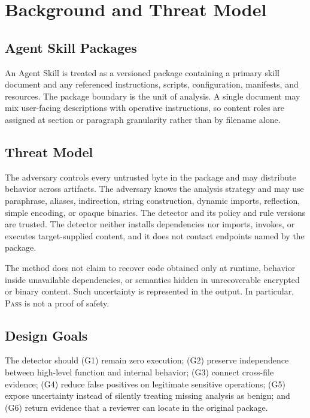 \section{Background and Threat Model}
\label{sec:background}

\subsection{Agent Skill Packages}

An Agent Skill is treated as a versioned package containing a primary skill
document and any referenced instructions, scripts, configuration, manifests,
and resources.  The package boundary is the unit of analysis.  A single
document may mix user-facing descriptions with operative instructions, so
content roles are assigned at section or paragraph granularity rather than by
filename alone.

\subsection{Threat Model}

The adversary controls every untrusted byte in the package and may distribute
behavior across artifacts.  The adversary knows the analysis strategy and may
use paraphrase, aliases, indirection, string construction, dynamic imports,
reflection, simple encoding, or opaque binaries.  The detector and its policy
and rule versions are trusted.  The detector neither installs dependencies nor
imports, invokes, or executes target-supplied content, and it does not contact
endpoints named by the package.

The method does not claim to recover code obtained only at runtime, behavior
inside unavailable dependencies, or semantics hidden in unrecoverable encrypted
or binary content.  Such uncertainty is represented in the output.  In
particular, \textsc{Pass} is not a proof of safety.

\subsection{Design Goals}

The detector should (G1) remain zero execution; (G2) preserve independence
between high-level function and internal behavior; (G3) connect cross-file
evidence; (G4) reduce false positives on legitimate sensitive operations;
(G5) expose uncertainty instead of silently treating missing analysis as
benign; and (G6) return evidence that a reviewer can locate in the original
package.
